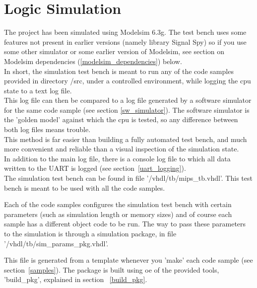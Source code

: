 \chapter{Logic Simulation}
\label{logic_simulation}

    The project has been simulated using Modelsim 6.3g. The test bench
    uses some features not present in earlier versions (namely library Signal 
    Spy) so if you use some other simulator or some earlier version of Modelsim, 
    see section on Modelsim dependencies (\ref{modelsim_dependencies}) below.\\

    In short, the simulation test bench is meant to run any of the code samples
    provided in directory /src, under a controlled environment, while logging
    the cpu state to a text log file.\\

    This log file can then be compared to a log file generated by a software
    simulator for the same code sample (see section \ref{sw_simulator}). The software
    simulator is the 'golden model' against which the cpu is tested, so any
    difference between both log files means trouble.\\

    This method is far easier than building a fully automated test bench, and
    much more convenient and reliable than a visual inspection of the simulation
    state.\\
    
    In addition to the main log file, there is a console log file to which all 
    data written to the UART is logged (see section~\ref{uart_logging}).\\

    
    The simulation test bench can be found in file '/vhdl/tb/mips\_tb.vhdl'. 
    This test bench is meant to be used with all the code samples. 
    
    Each of the code samples configures the simulation test bench with certain 
    parameters (such as simulation length or memory sizes) and of course each
    sample has a different object code to be run. The way to pass these 
    parameters to the simulation is through a simulation package, in file 
    '/vhdl/tb/sim\_params\_pkg.vhdl'.
    
    This file is generated from a template whenever you 'make' each code sample
    (see section~\ref{samples}). The package is built using oe of the 
    provided tools, 'build\_pkg', explained in section ~\ref{build_pkg}.

